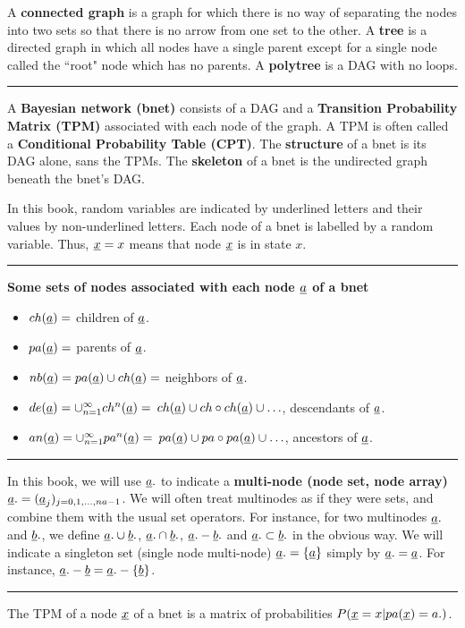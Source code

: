 A {\bf connected graph}
is a graph for which there
is no way of separating
the nodes into
two sets so that there is no arrow 
from one set to the other.
A {\bf tree}
is a directed graph
in which all nodes
have a single parent
except for a single 
node called the ``root" node
which has no parents.
A {\bf polytree}
is a DAG with
no loops.





\hrule

A {\bf Bayesian network (bnet)}
consists of a DAG 
and a 
{\bf Transition 
Probability Matrix (TPM)}
associated 
with each node
of the graph.
A TPM is often 
called a {\bf Conditional Probability
Table 
(CPT)}.
The {\bf structure} of a bnet
is its DAG alone, sans the TPMs.
The 
{\bf skeleton} of a bnet is the
undirected graph beneath the bnet's
DAG.



In 
this book,
random  variables are
 indicated by 
underlined letters and their values 
by non-underlined letters.
 Each node of a bnet is
 labelled by a random variable.
 Thus, ${\underline{x}}=x$ means that node 
${\underline{x}}$ is in state $x$.


\hrule\noindent
{\bf Some sets of nodes 
associated 
with each node ${\underline{a}}$
of a bnet}
\begin{itemize}
\item
$ch({\underline{a}})=$ children of ${\underline{a}}$.
\item
$pa({\underline{a}})=$ parents of ${\underline{a}}$.
\item
$nb({\underline{a}})=pa({\underline{a}})\cup ch({\underline{a}})=$ 
neighbors of ${\underline{a}}$.
\item
$de({\underline{a}})=\cup_{n=1}^{\infty}ch^n({\underline{a}})=$
$ch({\underline{a}})\cup ch\circ ch({\underline{a}})\cup\ldots$, 
descendants of ${\underline{a}}$. 
\item
$an({\underline{a}})=\cup_{n=1}^{\infty}pa^n({\underline{a}})=$
$pa({\underline{a}})\cup pa\circ pa({\underline{a}})\cup\ldots$, 
ancestors of ${\underline{a}}$.
\end{itemize}
\hrule
In this book,
we will use 
${\underline{a}}.$
to indicate
a {\bf multi-node (node set,
node array)} ${\underline{a}}.=
({\underline{a}}_j)_{j=0, 1, \ldots , na-1}$.
We will often
treat multinodes as if
they were sets, and
combine them with
the usual
set
operators.
For instance,
for two
multinodes ${\underline{a}}.$
and ${\underline{b}}.$,
we define
${\underline{a}}.\cup{\underline{b}}.$,
${\underline{a}}.\cap{\underline{b}}.$,
${\underline{a}}.-{\underline{b}}.$
and
${\underline{a}}.\subset{\underline{b}}.$
in the obvious way.
We 
will indicate
a singleton set (single
node multi-node) ${\underline{a}}.=\{{\underline{a}}\}$
simply by ${\underline{a}}.={\underline{a}}$.
For instance,
${\underline{a}}.-{\underline{b}}={\underline{a}}.-\{{\underline{b}}\}$.
\hrule

The TPM of a node
${\underline{x}}$ of a bnet
is a matrix of
probabilities 
$P({\underline{x}}=x|pa({\underline{x}})=a.)$.

